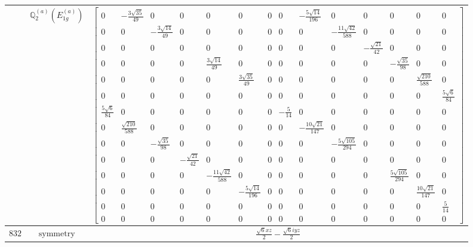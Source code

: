 \documentclass[fleqn,8pt,landscape]{jsarticle}
\begin{document}
\begin{longtable}{ccc}
$  $ & $ \mathbb{Q}_{2}^{(a)}(E_{1g}^{(a)}) $ & $ \begin{bmatrix} 0 & - \frac{3 \sqrt{35}}{49} & 0 & 0 & 0 & 0 & 0 & 0 & - \frac{5 \sqrt{14}}{196} & 0 & 0 & 0 & 0 & 0 \\ 0 & 0 & - \frac{3 \sqrt{14}}{49} & 0 & 0 & 0 & 0 & 0 & 0 & - \frac{11 \sqrt{42}}{588} & 0 & 0 & 0 & 0 \\ 0 & 0 & 0 & 0 & 0 & 0 & 0 & 0 & 0 & 0 & - \frac{\sqrt{21}}{42} & 0 & 0 & 0 \\ 0 & 0 & 0 & 0 & \frac{3 \sqrt{14}}{49} & 0 & 0 & 0 & 0 & 0 & 0 & - \frac{\sqrt{35}}{98} & 0 & 0 \\ 0 & 0 & 0 & 0 & 0 & \frac{3 \sqrt{35}}{49} & 0 & 0 & 0 & 0 & 0 & 0 & \frac{\sqrt{210}}{588} & 0 \\ 0 & 0 & 0 & 0 & 0 & 0 & 0 & 0 & 0 & 0 & 0 & 0 & 0 & \frac{5 \sqrt{6}}{84} \\ \frac{5 \sqrt{6}}{84} & 0 & 0 & 0 & 0 & 0 & 0 & - \frac{5}{14} & 0 & 0 & 0 & 0 & 0 & 0 \\ 0 & \frac{\sqrt{210}}{588} & 0 & 0 & 0 & 0 & 0 & 0 & - \frac{10 \sqrt{21}}{147} & 0 & 0 & 0 & 0 & 0 \\ 0 & 0 & - \frac{\sqrt{35}}{98} & 0 & 0 & 0 & 0 & 0 & 0 & - \frac{5 \sqrt{105}}{294} & 0 & 0 & 0 & 0 \\ 0 & 0 & 0 & - \frac{\sqrt{21}}{42} & 0 & 0 & 0 & 0 & 0 & 0 & 0 & 0 & 0 & 0 \\ 0 & 0 & 0 & 0 & - \frac{11 \sqrt{42}}{588} & 0 & 0 & 0 & 0 & 0 & 0 & \frac{5 \sqrt{105}}{294} & 0 & 0 \\ 0 & 0 & 0 & 0 & 0 & - \frac{5 \sqrt{14}}{196} & 0 & 0 & 0 & 0 & 0 & 0 & \frac{10 \sqrt{21}}{147} & 0 \\ 0 & 0 & 0 & 0 & 0 & 0 & 0 & 0 & 0 & 0 & 0 & 0 & 0 & \frac{5}{14} \\ 0 & 0 & 0 & 0 & 0 & 0 & 0 & 0 & 0 & 0 & 0 & 0 & 0 & 0 \end{bmatrix} $ \\ \hline
$ 832 $ & $ \text{symmetry} $ & $ \frac{\sqrt{6} x z}{2} - \frac{\sqrt{6} i y z}{2} $ \\

\end{longtable}
\end{document}
